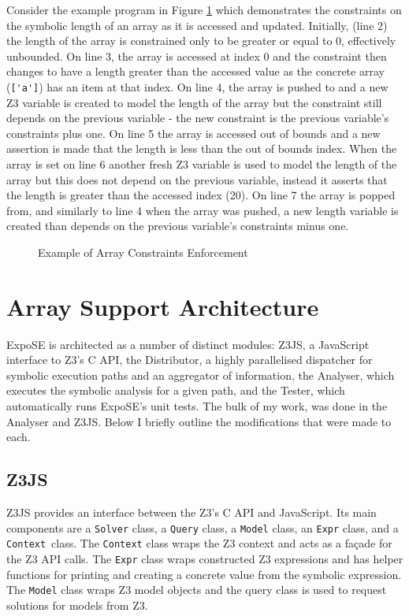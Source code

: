 \documentclass[]{final_report}
\begin{document}
Consider the example program in Figure \ref{fig:expose-array-length} which demonstrates the constraints on the symbolic length of an array as it is accessed and updated. Initially, (line 2) the length of the array is constrained only to be greater or equal to 0, effectively unbounded. On line 3, the array is accessed at index 0 and the constraint then changes to have a length greater than the accessed value as the concrete array (\lstinline|['a']|) has an item at that index. On line 4, the array is pushed to and a new Z3 variable is created to model the length of the array but the constraint still depends on the previous variable - the new constraint is the previous variable's constraints plus one. On line 5 the array is accessed out of bounds and a new assertion is made that the length is less than the out of bounds index. When the array is set on line 6 another fresh Z3 variable is used to model the length of the array but this does not depend on the previous variable, instead it asserts that the length is greater than the accessed index (20). On line 7 the array is popped from, and similarly to line 4 when the array was pushed, a new length variable is created than depends on the previous variable's constraints minus one.

\begin{figure}[t]

\caption{\label{fig:expose-array-length} Example of Array Constraints Enforcement}
\end{figure}

\section{Array Support Architecture}
ExpoSE is architected as a number of distinct modules: Z3JS, a JavaScript interface to Z3’s C API, the Distributor, a highly parallelised dispatcher for symbolic execution paths and an aggregator of information, the Analyser, which executes the symbolic analysis for a given path, and the Tester, which automatically runs ExpoSE’s unit tests. The bulk of my work, was done in the Analyser and Z3JS. Below I briefly outline the modifications that were made to each.

\subsection{Z3JS}
Z3JS provides an interface between the Z3’s C API and JavaScript. Its main components are a \lstinline|Solver| class, a \lstinline|Query| class, a \lstinline|Model| class, an \lstinline|Expr| class, and a \lstinline|Context|~class. The \lstinline|Context| class wraps the Z3 context and acts as a façade for the Z3 API calls. The \lstinline|Expr| class wraps constructed Z3 expressions and has helper functions for printing and creating a concrete value from the symbolic expression. The \lstinline|Model| class wraps Z3 model objects and the query class is used to request solutions for models from Z3.
\end{document}
